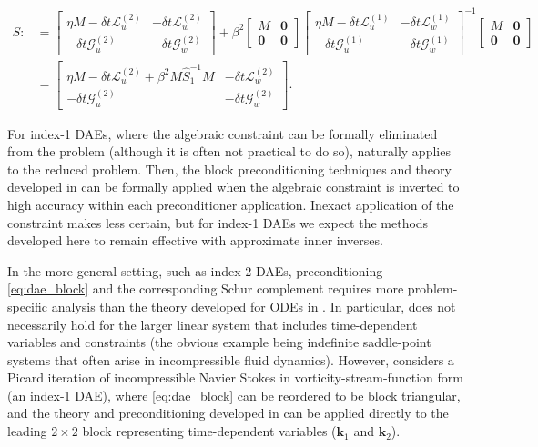 \documentclass[review]{siamart}
\begin{document}
\begin{align*}
S :& = \begin{bmatrix} \eta M - \delta t\mathcal{L}_{u}^{(2)} &
	-\delta t\mathcal{L}_{w}^{(2)} \\ -\delta t\mathcal{G}_{u}^{(2)} &
		-\delta t\mathcal{G}_w^{(2)} \end{bmatrix}
	+ \beta^2 \begin{bmatrix} M & \mathbf{0} \\\mathbf{0} & \mathbf{0} \end{bmatrix}
	\begin{bmatrix} \eta M - \delta t\mathcal{L}_{u}^{(1)} &
	-\delta t\mathcal{L}_{w}^{(1)} \\ -\delta t\mathcal{G}_{u}^{(1)} &
		-\delta t\mathcal{G}_w^{(1)} \end{bmatrix}^{-1}
	\begin{bmatrix} M & \mathbf{0} \\\mathbf{0} & \mathbf{0} \end{bmatrix} \\
& = \begin{bmatrix} \eta M - \delta t\mathcal{L}_{u}^{(2)} + \beta^2M \widehat{S}_1^{-1}M &
	-\delta t\mathcal{L}_{w}^{(2)} \\ -\delta t\mathcal{G}_{u}^{(2)} &
		-\delta t\mathcal{G}_w^{(2)} \end{bmatrix}.
\end{align*}
%

For index-1 DAEs, where the algebraic constraint can be formally eliminated from
the problem (although it is often not practical to do so), 
naturally applies to the reduced problem. Then, the block preconditioning
techniques and theory developed in  can be formally applied
when the algebraic constraint is inverted to high accuracy within each
preconditioner application. Inexact application of the constraint makes
 less certain, but for index-1 DAEs we expect the methods
developed here to remain effective with approximate inner inverses.

In the more general setting, such as index-2 DAEs, preconditioning
\eqref{eq:dae_block} and the corresponding Schur complement requires more
problem-specific analysis than the theory developed for ODEs in
. In particular,  does not necessarily hold for
the larger linear system that includes time-dependent variables and constraints
(the obvious example being indefinite saddle-point systems that often arise in
incompressible fluid dynamics). However,  considers a
Picard iteration of incompressible Navier Stokes in vorticity-stream-function
form (an index-1 DAE), where \eqref{eq:dae_block} can be reordered to be block
triangular, and the theory and preconditioning developed in 
can be applied directly to the leading $2\times 2$ block representing
time-dependent variables ($\mathbf{k}_1$ and $\mathbf{k}_2$).
\end{document}
